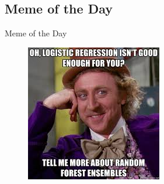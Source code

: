 \subsection{Meme of the Day}

\begin{frame}{Meme of the Day}{}
	\begin{figure}
		\includegraphics[scale=0.65]{08_decision_trees/02_img/meme_of_the_day}
	\end{figure}
\end{frame}


\makethanks

